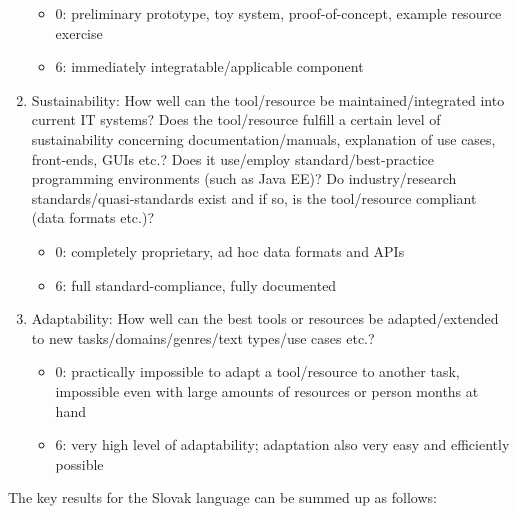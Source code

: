 \begin{multicols}{2}
\begin{enumerate}
\begin{itemize}
\item 0: preliminary prototype, toy system, proof-of-concept, example resource exercise
\item 6: immediately integratable/applicable component
\end{itemize}
\item Sustainability: How well can the tool/resource be maintained/integrated into current IT systems? Does the tool/resource fulfill a certain level of sustainability concerning documentation/manuals, explanation of use cases, front-ends, GUIs etc.? Does it use/employ standard/best-practice programming environments (such as Java EE)? Do industry/research standards/quasi-standards exist and if so, is the tool/resource compliant (data formats etc.)?
\begin{itemize}
\item 0: completely proprietary, ad hoc data formats and APIs
\item 6: full standard-compliance, fully documented
\end{itemize}
\item Adaptability: How well can the best tools or resources be adapted/extended to new tasks/domains/genres/text types/use cases etc.?
\begin{itemize}
\item 0: practically impossible to adapt a tool/resource to another task, impossible even with large amounts of resources or person months at hand
\item 6: very high level of adaptability; adaptation also very easy and efficiently possible
\end{itemize}
\end{enumerate}

The key results for the Slovak language can be summed up as follows:


\end{multicols}
